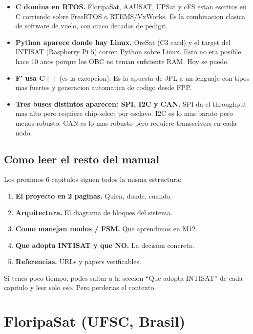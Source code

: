 \documentclass[11pt,a4paper,oneside,openright]{book}
\begin{document}
\begin{itemize}[leftmargin=2em]
  \item \textbf{C domina en RTOS.} FloripaSat, AAUSAT, UPSat y cFS
    estan escritos en C corriendo sobre FreeRTOS o RTEMS/VxWorks.
    Es la combinacion clasica de software de vuelo, con cinco
    decadas de pedigri.
  \item \textbf{Python aparece donde hay Linux.} OreSat (C3 card) y
    el target del INTISAT (Raspberry Pi 5) corren Python sobre Linux.
    Esto no era posible hace 10 anos porque los OBC no tenian
    suficiente RAM. Hoy se puede.
  \item \textbf{F' usa C++} (es la excepcion). Es la apuesta de JPL
    a un lenguaje con tipos mas fuertes y generacion automatica de
    codigo desde FPP.
  \item \textbf{Tres buses distintos aparecen: SPI, I2C y CAN.}
    SPI da el throughput mas alto pero requiere chip-select por
    esclavo. I2C es lo mas barato pero menos robusto. CAN es lo
    mas robusto pero requiere transceivers en cada nodo.
\end{itemize}

\section{Como leer el resto del manual}

Los proximos 6 capitulos siguen todos la misma estructura:

\begin{enumerate}[leftmargin=2em]
  \item \textbf{El proyecto en 2 paginas.} Quien, donde, cuando.
  \item \textbf{Arquitectura.} El diagrama de bloques del sistema.
  \item \textbf{Como manejan modos / FSM.} Que aprendimos en M12.
  \item \textbf{Que adopta INTISAT y que NO.} La decision concreta.
  \item \textbf{Referencias.} URLs y papers verificables.
\end{enumerate}

Si tenes poco tiempo, podes saltar a la seccion ``Que adopta INTISAT''
de cada capitulo y leer solo eso. Pero perderias el contexto.

\chapter{FloripaSat (UFSC, Brasil)}
\end{document}
